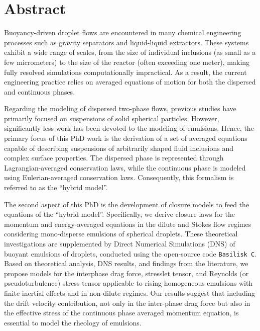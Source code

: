 \chapter*{\centering Abstract}

Buoyancy-driven droplet flows are encountered in many chemical engineering processes such as gravity separators and liquid-liquid extractors. 
These systems exhibit a wide range of scales, from the size of individual inclusions (as small as a few micrometers) to the size of the reactor (often exceeding one meter), making fully resolved simulations computationally impractical.
As a result, the current engineering practice relies on averaged equations of motion for both the dispersed and continuous phases.

Regarding the modeling of dispersed two-phase flows, previous studies have primarily focused on suspensions of solid spherical particles. 
However, significantly less work has been devoted to the modeling of emulsions. 
Hence, the primary focus of this PhD work is the derivation of a set of averaged equations capable of describing suspensions of arbitrarily shaped fluid inclusions and complex surface properties. 
The dispersed phase is represented through Lagrangian-averaged conservation laws, while the continuous phase is modeled using Eulerian-averaged conservation laws. 
Consequently, this formalism is referred to as the ``hybrid model''. 

The second aspect of this PhD is the development of closure models to feed the equations of the ``hybrid model''. 
Specifically, we derive closure laws for the momentum and energy-averaged equations in the dilute and Stokes flow regimes considering mono-disperse emulsions of spherical droplets. 
These theoretical investigations are supplemented by Direct Numerical Simulations (DNS) of buoyant emulsions of droplets, conducted using the open-source code \texttt{Basilisk C}. 
Based on theoretical analysis, DNS results, and findings from the literature, we propose models for the interphase drag force, stresslet tensor, and Reynolds (or pseudoturbulence) stress tensor applicable to rising homogeneous emulsions with finite inertial effects and in non-dilute regimes. 
Our results suggest that including the drift velocity contribution, not only in the inter-phase drag force but also in the effective stress of the continuous phase averaged momentum equation, is essential to model the rheology of emulsions. 

